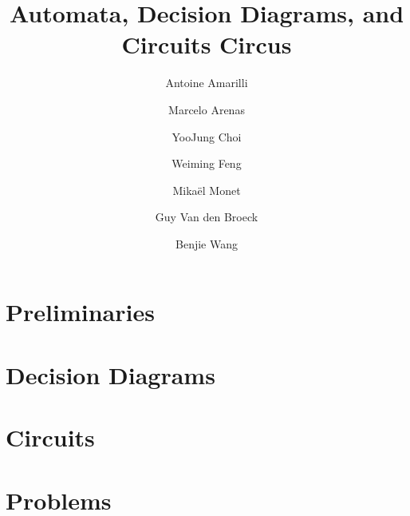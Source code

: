 \documentclass[letterpaper,11pt]{article}
\begin{document}
\title{Automata, Decision Diagrams, and Circuits Circus}

\author{Antoine Amarilli \and Marcelo Arenas \and YooJung Choi \and Weiming Feng \and Mikaël Monet \and Guy Van den Broeck \and Benjie Wang}

\date{}
\maketitle

\section{Preliminaries}


\section{Decision Diagrams}


\section{Circuits}


\section{Problems}




\end{document}
